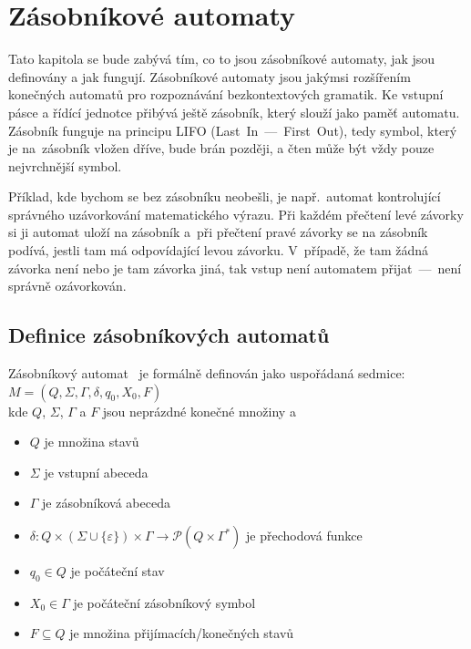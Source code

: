 \chapter{Zásobníkové automaty}\label{chap:PushdownAutomata}

Tato kapitola se bude zabývá tím, co to jsou zásobníkové automaty, jak jsou definovány a jak fungují. Zásobníkové automaty jsou jakýmsi rozšířením konečných automatů pro rozpoznávání bezkontextových gramatik. Ke vstupní pásce a řídící jednotce přibývá ještě zásobník, který slouží jako paměť automatu. Zásobník funguje na principu LIFO (Last~In~---~First~Out), tedy symbol, který je na~zásobník vložen dříve, bude brán později, a čten může být vždy pouze nejvrchnější symbol.

Příklad, kde bychom se bez zásobníku neobešli, je např.~automat kontrolující správného uzávorkování matematického výrazu. Při každém přečtení levé závorky si ji automat uloží na zásobník a~při přečtení pravé závorky se na zásobník podívá, jestli tam má odpovídající levou závorku. V~případě, že tam žádná závorka není nebo je tam závorka jiná, tak vstup není automatem přijat~---~není správně ozávorkován.

\section{Definice zásobníkových automatů}\label{sec:DefinitonOfPDA}

Zásobníkový automat~\cite{Sipserc2006}  je formálně definován jako uspořádaná sedmice:\\
\indent\emph{$M = (Q, \Sigma, \Gamma, \delta, q_0, X_0, F)$}\\
kde $Q$, $\Sigma$, $\Gamma$ a $F$ jsou neprázdné konečné množiny a 

\begin{itemize}
    \item $Q$ je množina stavů
    \item $\Sigma$ je vstupní abeceda
    \item $\Gamma$ je zásobníková abeceda
    \item $\delta : Q \times (\Sigma \cup \{\varepsilon\}) \times \Gamma \rightarrow \mathcal{P}(Q \times \Gamma^*)$ je přechodová funkce
    \item $q_0 \in Q$ je počáteční stav
    \item $X_0 \in \Gamma$ je počáteční zásobníkový symbol
    \item $F \subseteq Q$ je množina přijímacích/konečných stavů
\end{itemize}

